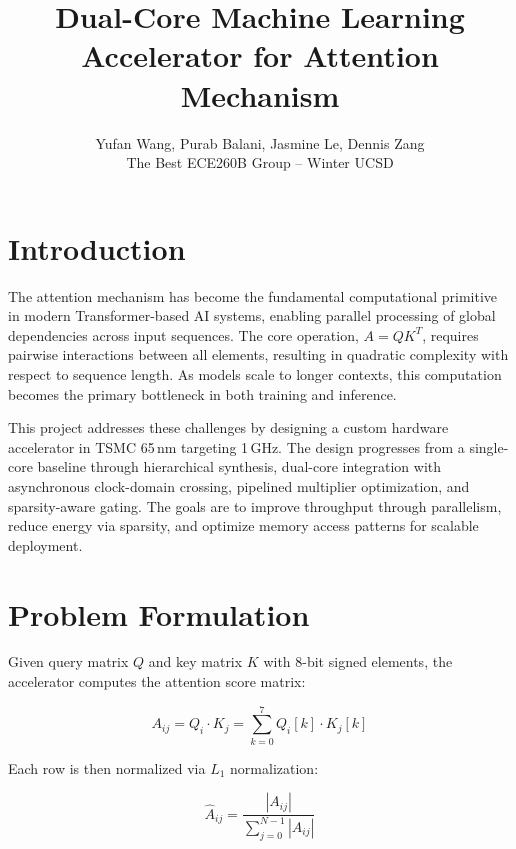 \documentclass[10pt,twocolumn]{article}
\title{\vspace{-1.8em}\textbf{Dual-Core Machine Learning Accelerator
for Attention Mechanism}\vspace{-0.8em}}
\author{Yufan Wang, Purab Balani, Jasmine Le, Dennis Zang\\
The Best ECE260B Group -- Winter UCSD}
\date{}
\begin{document}
\maketitle

\section{Introduction}

The attention mechanism has become the fundamental computational
primitive in modern Transformer-based AI systems, enabling parallel
processing of global dependencies across input sequences. The core
operation, $A = QK^T$, requires pairwise interactions between all
elements, resulting in quadratic complexity with respect to sequence
length. As models scale to longer contexts, this computation becomes
the primary bottleneck in both training and inference.

This project addresses these challenges by designing a custom
hardware accelerator in TSMC 65\,nm targeting 1\,GHz. The design
progresses from a single-core baseline through hierarchical
synthesis, dual-core integration with asynchronous clock-domain
crossing, pipelined multiplier optimization, and sparsity-aware
gating. The goals are to improve throughput through parallelism,
reduce energy via sparsity, and optimize memory access patterns
for scalable deployment.

\section{Problem Formulation}

Given query matrix $Q$ and key matrix $K$ with 8-bit signed
elements, the accelerator computes the attention score matrix:

\vspace{-4pt}
$$A_{ij} = Q_i \cdot K_j
= \sum_{k=0}^{7} Q_i[k] \cdot K_j[k]$$
\vspace{-4pt}

Each row is then normalized via $L_1$ normalization:

\vspace{-4pt}
$$\hat{A}_{ij}
= \frac{|A_{ij}|}{\sum_{j=0}^{N-1} |A_{ij}|}$$
\vspace{-4pt}
\end{document}
